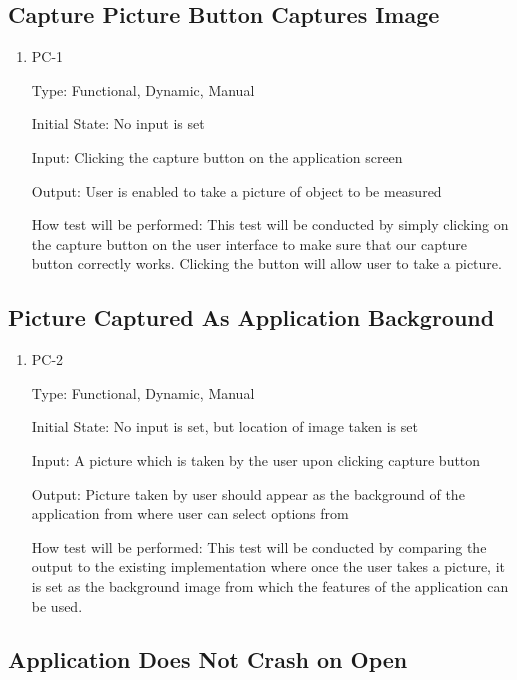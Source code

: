 \documentclass[12pt, titlepage]{article}
\begin{document}
\subsection{Capture Picture Button Captures Image}
		
\begin{enumerate}

\item{PC-1\\}

Type: Functional, Dynamic, Manual
					
Initial State: No input is set
					
Input: Clicking the capture button on the application screen
					
Output: User is enabled to take a picture of object to be measured
					
How test will be performed: This test will be conducted by simply clicking on the capture button on the user interface to make sure that our capture button correctly works. Clicking the button will allow user to take a picture. 

\end{enumerate}

\subsection{Picture Captured As Application Background}

\begin{enumerate}

\item{PC-2\\}

Type: Functional, Dynamic, Manual
					
Initial State: No input is set, but location of image taken is set
					
Input: A picture which is taken by the user upon clicking capture button
					
Output: Picture taken by user should appear as the background of the application from where user can select options from
					
How test will be performed: This test will be conducted by comparing the output to the existing implementation where once the user takes a picture, it is set as the background image from which the features of the application can be used.  

\end{enumerate}

\subsection{Application Does Not Crash on Open}
\end{document}

